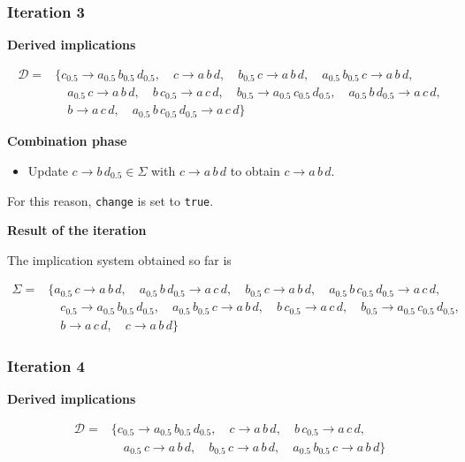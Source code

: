 \documentclass[
  letterpaper,
  DIV=11,
  numbers=noendperiod]{scrartcl}
\providecommand{\tightlist}{%
  \setlength{\itemsep}{0pt}\setlength{\parskip}{0pt}}\usepackage{longtable,booktabs,array}
\begin{document}
\subsubsection{Iteration 3}\label{iteration-3}

\textbf{Derived implications}

\begin{align*}
\mathcal D = & \big\{c_{0.5} \to a_{0.5}\,b_{0.5}\,d_{0.5},\quad  c \to a\,b\,d,\quad b_{0.5}\,c \to a\,b\,d,\quad a_{0.5}\,b_{0.5}\,c \to a\,b\,d, \\
& \quad a_{0.5}\,c \to a\,b\,d,\quad b\,c_{0.5} \to a\,c\,d,\quad b_{0.5} \to a_{0.5}\,c_{0.5}\,d_{0.5},\quad a_{0.5}\,b\,d_{0.5} \to a\,c\,d,\\
&\quad b \to a\,c\,d,\quad a_{0.5}\,b\,c_{0.5}\,d_{0.5} \to a\,c\,d\big\}
\end{align*}

\textbf{Combination phase}

\begin{itemize}
\tightlist
\item
  Update \(c \to b\,d_{0.5}\in\Sigma\) with \(c \to a\,b\,d\) to obtain
  \(c \to a\,b\,d\).
\end{itemize}

For this reason, \texttt{change} is set to \texttt{true}.

\textbf{Result of the iteration}

The implication system obtained so far is

\begin{align*}
\Sigma = & \big\{a_{0.5}\,c \to a\,b\,d,\quad a_{0.5}\,b\,d_{0.5} \to a\,c\,d,\quad b_{0.5}\,c \to a\,b\,d,\quad a_{0.5}\,b\,c_{0.5}\,d_{0.5} \to a\,c\,d,\\
&\quad c_{0.5} \to a_{0.5}\,b_{0.5}\,d_{0.5},\quad a_{0.5}\,b_{0.5}\,c \to a\,b\,d,\quad b\,c_{0.5} \to a\,c\,d,\quad b_{0.5} \to a_{0.5}\,c_{0.5}\,d_{0.5}, \\
&\quad b \to a\,c\,d,\quad c \to a\,b\,d\big\}
\end{align*}

\subsubsection{Iteration 4}\label{iteration-4}

\textbf{Derived implications}

\begin{align*}
\mathcal D = & \big\{c_{0.5} \to a_{0.5}\,b_{0.5}\,d_{0.5},\quad c \to a\,b\,d,\quad b\,c_{0.5} \to a\,c\,d,\\
&\quad a_{0.5}\,c \to a\,b\,d,\quad b_{0.5}\,c \to a\,b\,d,\quad a_{0.5}\,b_{0.5}\,c \to a\,b\,d\big\}
\end{align*}
\end{document}
